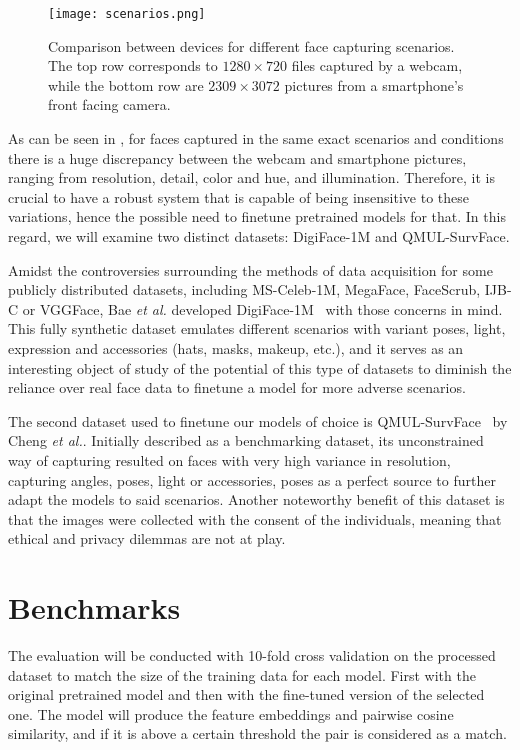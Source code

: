 \documentclass[class=report, crop=false, a4paper, 12pt]{standalone}
\begin{document}
\begin{figure}[H]
  \centering
  \texttt{[image: scenarios.png]}
  \caption[Comparison between devices for different face capturing scenarios.]{Comparison between devices for different face capturing scenarios. The top row corresponds to $1280\times720$ files captured by a webcam, while the bottom row are $2309\times3072$ pictures from a smartphone's front facing camera.}
  \label{fig:scenarios}
\end{figure}

As can be seen in , for faces captured in the same exact scenarios and conditions there is a huge discrepancy between the webcam and smartphone pictures, ranging from resolution, detail, color and hue, and illumination. Therefore, it is crucial to have a robust system that is capable of being insensitive to these variations, hence the possible need to finetune pretrained models for that. In this regard, we will examine two distinct datasets: DigiFace-1M and QMUL-SurvFace.
\par Amidst the controversies surrounding the methods of data acquisition for some publicly distributed datasets, including MS-Celeb-1M, MegaFace, FaceScrub, IJB-C or VGGFace, Bae \textit{et al.} developed DigiFace-1M~\autocite{baeDigiFace1MMillionDigital2023} with those concerns in mind. This fully synthetic dataset emulates different scenarios with variant poses, light, expression and accessories (hats, masks, makeup, etc.), and it serves as an interesting object of study of the potential of this type of datasets to diminish the reliance over real face data to finetune a model for more adverse scenarios.
\par The second dataset used to finetune our models of choice is QMUL-SurvFace~\autocite{chengSurveillanceFaceRecognition2018} by Cheng \textit{et al.}. Initially described as a benchmarking dataset, its unconstrained way of capturing resulted on faces with very high variance in resolution, capturing angles, poses, light or accessories, poses as a perfect source to further adapt the models to said scenarios. Another noteworthy benefit of this dataset is that the images were collected with the consent of the individuals, meaning that ethical and privacy dilemmas are not at play.

\section{Benchmarks}
\par The evaluation will be conducted with 10-fold cross validation on the processed dataset to match the size of the training data for each model. First with the original pretrained model and then with the fine-tuned version of the selected one. The model will produce the feature embeddings and pairwise cosine similarity, and if it is above a certain threshold the pair is considered as a match. 
\end{document}
